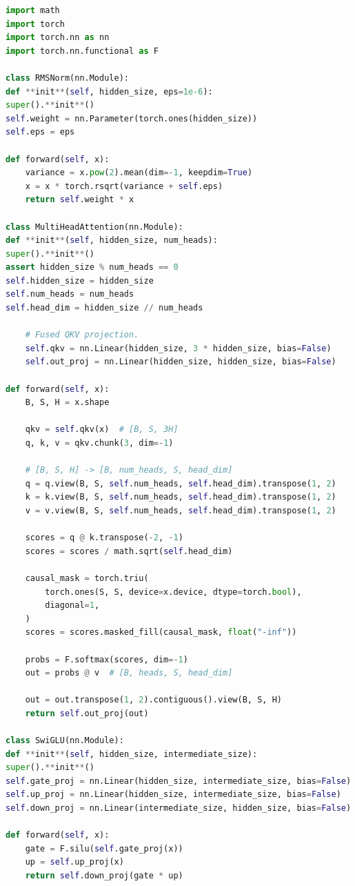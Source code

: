 \begin{lstlisting}[language=Python,caption={教学版 Transformer Decoder Block},label={lst:decoder-block-pytorch}]
import math
import torch
import torch.nn as nn
import torch.nn.functional as F

class RMSNorm(nn.Module):
def **init**(self, hidden_size, eps=1e-6):
super().**init**()
self.weight = nn.Parameter(torch.ones(hidden_size))
self.eps = eps

def forward(self, x):
    variance = x.pow(2).mean(dim=-1, keepdim=True)
    x = x * torch.rsqrt(variance + self.eps)
    return self.weight * x

class MultiHeadAttention(nn.Module):
def **init**(self, hidden_size, num_heads):
super().**init**()
assert hidden_size % num_heads == 0
self.hidden_size = hidden_size
self.num_heads = num_heads
self.head_dim = hidden_size // num_heads

    # Fused QKV projection.
    self.qkv = nn.Linear(hidden_size, 3 * hidden_size, bias=False)
    self.out_proj = nn.Linear(hidden_size, hidden_size, bias=False)

def forward(self, x):
    B, S, H = x.shape

    qkv = self.qkv(x)  # [B, S, 3H]
    q, k, v = qkv.chunk(3, dim=-1)

    # [B, S, H] -> [B, num_heads, S, head_dim]
    q = q.view(B, S, self.num_heads, self.head_dim).transpose(1, 2)
    k = k.view(B, S, self.num_heads, self.head_dim).transpose(1, 2)
    v = v.view(B, S, self.num_heads, self.head_dim).transpose(1, 2)

    scores = q @ k.transpose(-2, -1)
    scores = scores / math.sqrt(self.head_dim)

    causal_mask = torch.triu(
        torch.ones(S, S, device=x.device, dtype=torch.bool),
        diagonal=1,
    )
    scores = scores.masked_fill(causal_mask, float("-inf"))

    probs = F.softmax(scores, dim=-1)
    out = probs @ v  # [B, heads, S, head_dim]

    out = out.transpose(1, 2).contiguous().view(B, S, H)
    return self.out_proj(out)

class SwiGLU(nn.Module):
def **init**(self, hidden_size, intermediate_size):
super().**init**()
self.gate_proj = nn.Linear(hidden_size, intermediate_size, bias=False)
self.up_proj = nn.Linear(hidden_size, intermediate_size, bias=False)
self.down_proj = nn.Linear(intermediate_size, hidden_size, bias=False)

def forward(self, x):
    gate = F.silu(self.gate_proj(x))
    up = self.up_proj(x)
    return self.down_proj(gate * up)


\end{lstlisting}
